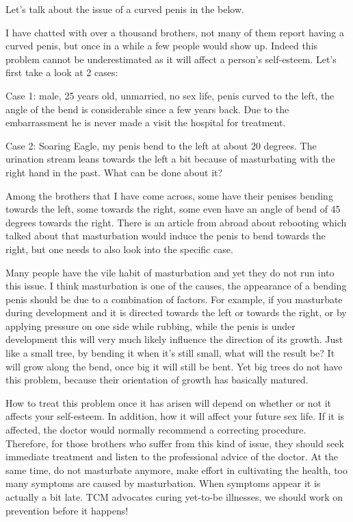 \documentclass[
]{book}
\begin{document}
Let's talk about the issue of a curved penis in the below.

I have chatted with over a thousand brothers, not many of them report having a curved penis, but once in a while a few people would show up. Indeed this problem cannot be underestimated as it will affect a person's self-esteem. Let's first take a look at 2 cases:

Case 1: male, 25 years old, unmarried, no sex life, penis curved to the left, the angle of the bend is considerable since a few years back. Due to the embarrassment he is never made a visit the hospital for treatment.

Case 2: Soaring Eagle, my penis bend to the left at about 20 degrees. The urination stream leans towards the left a bit because of masturbating with the right hand in the past. What can be done about it?

Among the brothers that I have come across, some have their penises bending towards the left, some towards the right, some even have an angle of bend of 45 degrees towards the right. There is an article from abroad about rebooting which talked about that masturbation would induce the penis to bend towards the right, but one needs to also look into the specific case.

Many people have the vile habit of masturbation and yet they do not run into this issue. I think masturbation is one of the causes, the appearance of a bending penis should be due to a combination of factors. For example, if you masturbate during development and it is directed towards the left or towards the right, or by applying pressure on one side while rubbing, while the penis is under development this will very much likely influence the direction of its growth. Just like a small tree, by bending it when it's still small, what will the result be? It will grow along the bend, once big it will still be bent. Yet big trees do not have this problem, because their orientation of growth has basically matured.

How to treat this problem once it has arisen will depend on whether or not it affects your self-esteem. In addition, how it will affect your future sex life. If it is affected, the doctor would normally recommend a correcting procedure. Therefore, for those brothers who suffer from this kind of issue, they should seek immediate treatment and listen to the professional advice of the doctor. At the same time, do not masturbate anymore, make effort in cultivating the health, too many symptoms are caused by masturbation. When symptoms appear it is actually a bit late. TCM advocates curing yet-to-be illnesses, we should work on prevention before it happens!
\end{document}
